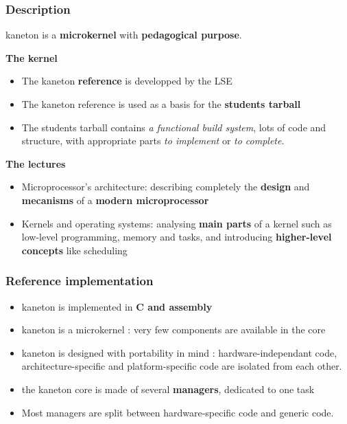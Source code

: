 \begin{frame}
  \frametitle{Description}

  kaneton is a \textbf{microkernel} with \textbf{pedagogical purpose}.

  \-
  \textbf{The kernel}
  \begin{itemize}
  \item The kaneton \textbf{reference} is developped by the LSE
  \item The kaneton reference is used as a basis for the \textbf{students tarball}
  \item The students tarball contains \textit{a functional build system}, lots of code and structure, with appropriate parts \textit{to implement} or \textit{to complete}.
  \end{itemize}

  \-
\textbf{The lectures}
  \begin{itemize}
    \item Microprocessor's architecture: describing completely the \textbf{design} and \textbf{mecanisms} of a \textbf{modern microprocessor}
    \item Kernels and operating systems: analysing \textbf{main parts} of a kernel such as low-level programming, memory and tasks, and introducing
    \textbf{higher-level concepts} like scheduling
  \end{itemize}

\end{frame}



\begin{frame}
  \frametitle{Reference implementation}

  \begin{itemize}
  \item kaneton is implemented in \textbf{C and assembly}
  \item kaneton is a microkernel : very few components are available in the core
  \item kaneton is designed with portability in mind : hardware-independant code, architecture-specific and platform-specific code are isolated from each other.
  \end{itemize}

  \-

  \begin{itemize}
  \item the kaneton core is made of several \textbf{managers}, dedicated to one task
  \item Most managers are split between hardware-specific code and generic code.
  \end{itemize}

\end{frame}


